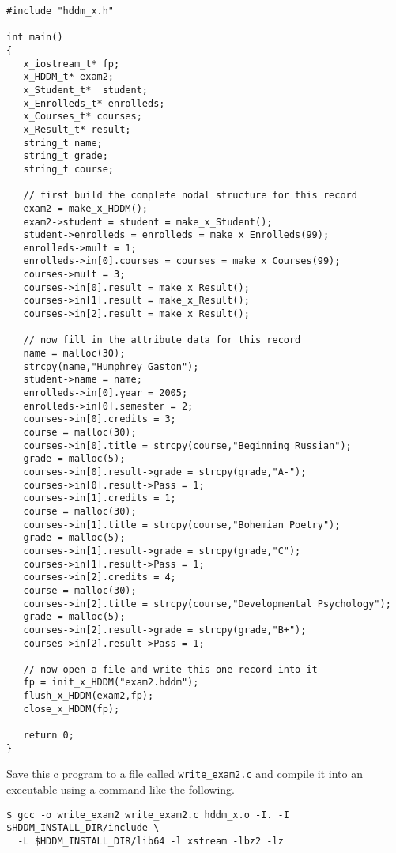 \documentclass{revtex4}
\begin{document}
\vspace{0.5cm}
\begin{minipage}{12cm}
\begin{verbatim}
#include "hddm_x.h"

int main()
{
   x_iostream_t* fp;
   x_HDDM_t* exam2;
   x_Student_t*  student;
   x_Enrolleds_t* enrolleds;
   x_Courses_t* courses;
   x_Result_t* result;
   string_t name;
   string_t grade;
   string_t course;

   // first build the complete nodal structure for this record
   exam2 = make_x_HDDM();
   exam2->student = student = make_x_Student();
   student->enrolleds = enrolleds = make_x_Enrolleds(99);
   enrolleds->mult = 1;
   enrolleds->in[0].courses = courses = make_x_Courses(99);
   courses->mult = 3;
   courses->in[0].result = make_x_Result();
   courses->in[1].result = make_x_Result();
   courses->in[2].result = make_x_Result();

   // now fill in the attribute data for this record
   name = malloc(30);
   strcpy(name,"Humphrey Gaston");
   student->name = name;
   enrolleds->in[0].year = 2005;
   enrolleds->in[0].semester = 2;
   courses->in[0].credits = 3;
   course = malloc(30);
   courses->in[0].title = strcpy(course,"Beginning Russian");
   grade = malloc(5);
   courses->in[0].result->grade = strcpy(grade,"A-");
   courses->in[0].result->Pass = 1;
   courses->in[1].credits = 1;
   course = malloc(30);
   courses->in[1].title = strcpy(course,"Bohemian Poetry");
   grade = malloc(5);
   courses->in[1].result->grade = strcpy(grade,"C");
   courses->in[1].result->Pass = 1;
   courses->in[2].credits = 4;
   course = malloc(30);
   courses->in[2].title = strcpy(course,"Developmental Psychology");
   grade = malloc(5);
   courses->in[2].result->grade = strcpy(grade,"B+");
   courses->in[2].result->Pass = 1;

   // now open a file and write this one record into it
   fp = init_x_HDDM("exam2.hddm");
   flush_x_HDDM(exam2,fp);
   close_x_HDDM(fp);

   return 0;
}
\end{verbatim}
\end{minipage}
\vspace{0.5cm}

Save this c program to a file called \texttt{write\_exam2.c} and compile it
into an executable using a command like the following.

\vspace{0.5cm}
\begin{minipage}{12cm}
\begin{verbatim}
$ gcc -o write_exam2 write_exam2.c hddm_x.o -I. -I $HDDM_INSTALL_DIR/include \
  -L $HDDM_INSTALL_DIR/lib64 -l xstream -lbz2 -lz
\end{verbatim}
\end{minipage}
\vspace{0.5cm}
\end{document}
